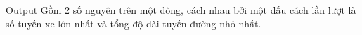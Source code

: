 Output
Gồm 2 số nguyên trên một dòng, cách nhau bởi một dấu cách lần lượt là số tuyến xe lớn nhất và tổng độ dài tuyến đường nhỏ nhất.